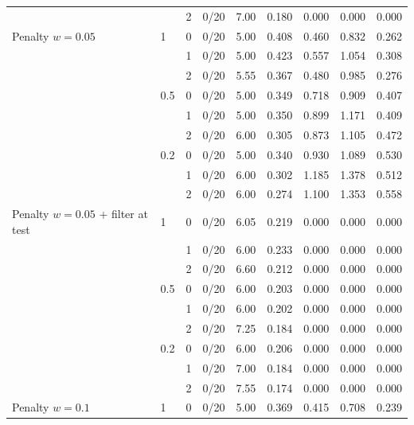 {\begin{tabular}{llrrrrrrr}
 &  & 2 & 0/20 & 7.00 & 0.180 & 0.000 & 0.000 & 0.000 \\
\addlinespace
Penalty $w{=}0.05$ & 1 & 0 & 0/20 & 5.00 & 0.408 & 0.460 & 0.832 & 0.262 \\
 &  & 1 & 0/20 & 5.00 & 0.423 & 0.557 & 1.054 & 0.308 \\
 &  & 2 & 0/20 & 5.55 & 0.367 & 0.480 & 0.985 & 0.276 \\
 & 0.5 & 0 & 0/20 & 5.00 & 0.349 & 0.718 & 0.909 & 0.407 \\
 &  & 1 & 0/20 & 5.00 & 0.350 & 0.899 & 1.171 & 0.409 \\
 &  & 2 & 0/20 & 6.00 & 0.305 & 0.873 & 1.105 & 0.472 \\
 & 0.2 & 0 & 0/20 & 5.00 & 0.340 & 0.930 & 1.089 & 0.530 \\
 &  & 1 & 0/20 & 6.00 & 0.302 & 1.185 & 1.378 & 0.512 \\
 &  & 2 & 0/20 & 6.00 & 0.274 & 1.100 & 1.353 & 0.558 \\
\addlinespace
Penalty $w{=}0.05$ + filter at test & 1 & 0 & 0/20 & 6.05 & 0.219 & 0.000 & 0.000 & 0.000 \\
 &  & 1 & 0/20 & 6.00 & 0.233 & 0.000 & 0.000 & 0.000 \\
 &  & 2 & 0/20 & 6.60 & 0.212 & 0.000 & 0.000 & 0.000 \\
 & 0.5 & 0 & 0/20 & 6.00 & 0.203 & 0.000 & 0.000 & 0.000 \\
 &  & 1 & 0/20 & 6.00 & 0.202 & 0.000 & 0.000 & 0.000 \\
 &  & 2 & 0/20 & 7.25 & 0.184 & 0.000 & 0.000 & 0.000 \\
 & 0.2 & 0 & 0/20 & 6.00 & 0.206 & 0.000 & 0.000 & 0.000 \\
 &  & 1 & 0/20 & 7.00 & 0.184 & 0.000 & 0.000 & 0.000 \\
 &  & 2 & 0/20 & 7.55 & 0.174 & 0.000 & 0.000 & 0.000 \\
\addlinespace
Penalty $w{=}0.1$ & 1 & 0 & 0/20 & 5.00 & 0.369 & 0.415 & 0.708 & 0.239 \\
\bottomrule\end{tabular}}
